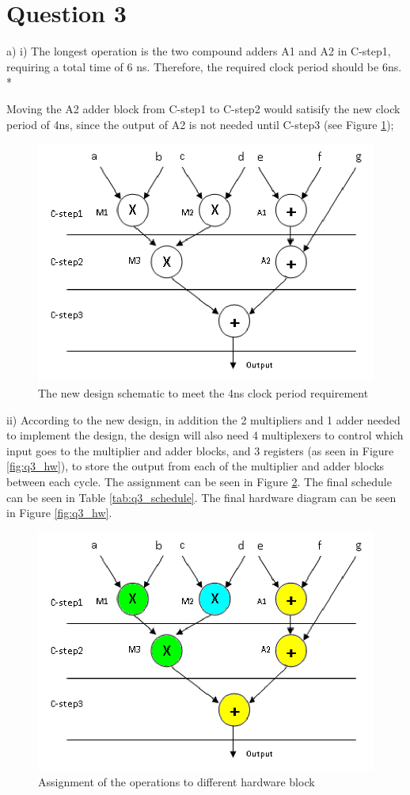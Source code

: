 \documentclass[11pt]{article}
\begin{document}
\section*{Question 3}
a)
i)
The longest operation is the two compound adders A1 and A2 in C-step1, requiring a total time of 6 ns. Therefore, the required clock period should be 6ns.\\*

Moving the A2 adder block from C-step1 to C-step2 would satisify the new clock period of 4ns, since the output of A2 is not needed until C-step3 (see Figure \ref{fig:q3_design});

\begin{figure}[h!]
  \centering
  \includegraphics[width=0.8\linewidth]{q3_design.png}
  \caption{The new design schematic to meet the 4ns clock period requirement}
  \label{fig:q3_design}
\end{figure}

ii)
According to the new design, in addition the 2 multipliers and 1 adder needed to implement the design, the design will also need 4 multiplexers to control which input goes to the multiplier and adder blocks, and 3 registers (as seen in Figure \ref{fig:q3_hw}), to store the output from each of the multiplier and adder blocks between each cycle. The assignment can be seen in Figure \ref{fig:q3_assign}. The final schedule can be seen in Table \ref{tab:q3_schedule}. The final hardware diagram can be seen in Figure \ref{fig:q3_hw}.

\begin{figure}[h!]
  \centering
  \includegraphics[width=0.8\linewidth]{q3_design2.png}
  \caption{Assignment of the operations to different hardware block}
  \label{fig:q3_assign}
\end{figure}
\end{document}
